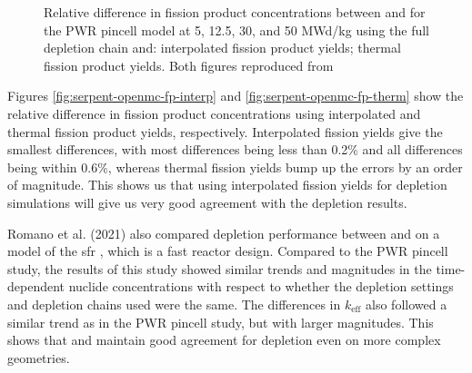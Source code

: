 \begin{figure}[htpb]
{    \label{fig:serpent-openmc-fp-therm}}
    \caption[Relative difference in fission product concentrations between
    OpenMC and Serpent for the PWR pincell model]{Relative difference in fission
    product concentrations between \OpenMC and \SerpentTWO for the PWR pincell model
    at 5, 12.5, 30, and 50 MWd/kg using the full depletion chain and:
     interpolated fission product yields;
     thermal fission product yields.
    Both figures reproduced from \cite{romano_depletion_2021}}
    \label{fig:pwr-serpent-openmc-fp}
\end{figure}

Figures \ref{fig:serpent-openmc-fp-interp} and
\ref{fig:serpent-openmc-fp-therm} show the relative difference in fission
product concentrations using interpolated and thermal fission product yields,
respectively. Interpolated fission yields give the smallest differences, with
most differences being less than 0.2\% and all differences being within 0.6\%,
whereas thermal fission yields bump up the errors by an order of magnitude. This
shows us that using interpolated fission yields for \OpenMC depletion
simulations will give us very good agreement with the \SerpentTWO depletion
results.

Romano et al. (2021) also compared depletion performance between \OpenMC and
\SerpentTWO on a model of the \Gls{sfr} \cite{oecd_benchmark_2016}, which is a
fast reactor design. Compared to the PWR pincell study, the results of this
study showed similar trends and magnitudes in the time-dependent nuclide
concentrations with respect to whether the depletion settings and
depletion chains used were the same. The differences in $k_\text{eff}$ also
followed a similar trend as in the PWR pincell study, but with larger
magnitudes. This shows that \OpenMC and \SerpentTWO maintain good agreement for
depletion even on more complex geometries.

